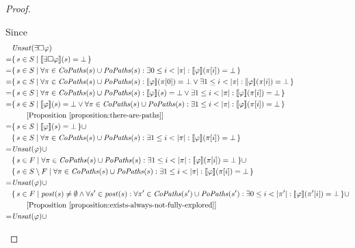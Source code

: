\documentclass[12pt]{article}
\newcommand{\always}{\Box}
\theoremstyle{definition}
\newcommand{\comment}[1]{\hspace{2em}[\mbox{#1}]}
\newcommand{\satisfaction}[1]{\llbracket #1 \rrbracket}
\newcommand{\bottom}{\mathord{\perp}}
\newenvironment{franck}{\color{red}}{\color{black}}
\begin{document}
\begin{proof}
\begin{itemize}
\begin{franck}
Since
\begin{align*}
& \mathit{Unsat}(\exists \always \varphi)\\
= & \{\, s \in S \mid \satisfaction{\exists \always \varphi}(s) = \bottom \,\}\\
= & \{\, s \in S \mid \forall \pi \in \mathit{CoPaths}(s) \cup \mathit{PoPaths}(s) : \exists 0 \leq i < |\pi| : \satisfaction{\varphi}(\pi[i]) = \bottom \,\}\\
= & \{\, s \in S \mid \forall \pi \in \mathit{CoPaths}(s) \cup \mathit{PoPaths}(s) : \satisfaction{\varphi}(\pi[0]) = \bottom \vee \exists 1 \leq i < |\pi| : \satisfaction{\varphi}(\pi[i]) = \bottom \,\}\\
= & \{\, s \in S \mid \forall \pi \in \mathit{CoPaths}(s) \cup \mathit{PoPaths}(s) : \satisfaction{\varphi}(s) = \bottom \vee \exists 1 \leq i < |\pi| : \satisfaction{\varphi}(\pi[i]) = \bottom \,\}\\
= & \{\, s \in S \mid \satisfaction{\varphi}(s) = \bottom \vee \forall \pi \in \mathit{CoPaths}(s) \cup \mathit{PoPaths}(s) : \exists 1 \leq i < |\pi| : \satisfaction{\varphi}(\pi[i]) = \bottom \,\}\\
& \comment{Proposition~\ref{proposition:there-are-paths}}\\
= & \{\, s \in S \mid \satisfaction{\varphi}(s) = \bottom \,\} \cup\\
& \{\, s \in S \mid \forall \pi \in \mathit{CoPaths}(s) \cup \mathit{PoPaths}(s) : \exists 1 \leq i < |\pi| : \satisfaction{\varphi}(\pi[i]) = \bottom \,\}\\
= & \mathit{Unsat}(\varphi) \cup\\
& \{\, s \in F \mid \forall \pi \in \mathit{CoPaths}(s) \cup \mathit{PoPaths}(s) : \exists 1 \leq i < |\pi| : \satisfaction{\varphi}(\pi[i]) = \bottom \,\} \cup\\
& \{\, s \in S \setminus F \mid \forall \pi \in \mathit{CoPaths}(s) \cup \mathit{PoPaths}(s) : \exists 1 \leq i < |\pi| : \satisfaction{\varphi}(\pi[i]) = \bottom \,\}\\
= & \mathit{Unsat}(\varphi) \cup\\
& \{\, s \in F \mid \mathit{post}(s) \not= \emptyset \wedge \forall s' \in \mathit{post}(s) : \forall \pi' \in \mathit{CoPaths}(s') \cup \mathit{PoPaths}(s') : \exists 0 \leq i < |\pi'| : \satisfaction{\varphi}(\pi'[i]) = \bottom\,\} \cup\\
& 
\comment{Proposition~\ref{proposition:exists-always-not-fully-explored}}\\
= & \mathit{Unsat}(\varphi) \cup\\

\end{align*}
\end{franck}
\end{itemize}
\end{proof}
\end{document}
